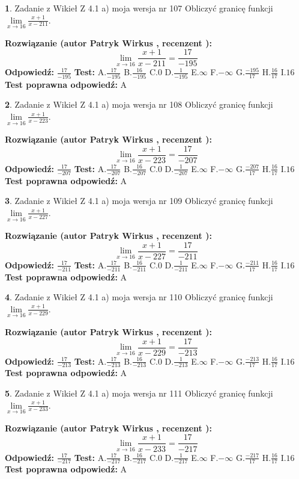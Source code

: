 \documentclass[12pt, a4paper]{article}
\theoremstyle{definition} %
\newtheorem{zad}{}
\newcommand{\zadStart}[1]{\begin{zad}#1\newline}
\newcommand{\zadStop}{\end{zad}}
\newcommand{\rozwStart}[2]{\noindent \textbf{Rozwiązanie (autor #1 , recenzent #2): }\newline}
\newcommand{\rozwStop}{\newline}
\newcommand{\odpStart}{\noindent \textbf{Odpowiedź:}\newline}
\newcommand{\odpStop}{\newline}
\newcommand{\testStart}{\noindent \textbf{Test:}\newline}
\newcommand{\testStop}{\newline}
\newcommand{\kluczStart}{\noindent \textbf{Test poprawna odpowiedź:}\newline}
\newcommand{\kluczStop}{\newline}
\begin{document}
\zadStart{Zadanie z Wikieł Z 4.1 a) moja wersja nr 107}
Obliczyć granicę funkcji $\lim\limits_{x\to16}\frac{x+1}{x-211}$.
\zadStop
\rozwStart{Patryk Wirkus}{}
$$\lim\limits_{x\to16}\frac{x+1}{x-211} = \frac{17}{-195}$$
\rozwStop
\odpStart
$\frac{17}{-195}$
\odpStop
\testStart
A.$\frac{17}{-195}$
B.$\frac{16}{-195}$
C.$0$
D.$\frac{1}{-195}$
E.$\infty$
F.$-\infty$
G.$\frac{-195}{17}$
H.$\frac{16}{17}$
I.$16$
\testStop
\kluczStart
A
\kluczStop



\zadStart{Zadanie z Wikieł Z 4.1 a) moja wersja nr 108}
Obliczyć granicę funkcji $\lim\limits_{x\to16}\frac{x+1}{x-223}$.
\zadStop
\rozwStart{Patryk Wirkus}{}
$$\lim\limits_{x\to16}\frac{x+1}{x-223} = \frac{17}{-207}$$
\rozwStop
\odpStart
$\frac{17}{-207}$
\odpStop
\testStart
A.$\frac{17}{-207}$
B.$\frac{16}{-207}$
C.$0$
D.$\frac{1}{-207}$
E.$\infty$
F.$-\infty$
G.$\frac{-207}{17}$
H.$\frac{16}{17}$
I.$16$
\testStop
\kluczStart
A
\kluczStop



\zadStart{Zadanie z Wikieł Z 4.1 a) moja wersja nr 109}
Obliczyć granicę funkcji $\lim\limits_{x\to16}\frac{x+1}{x-227}$.
\zadStop
\rozwStart{Patryk Wirkus}{}
$$\lim\limits_{x\to16}\frac{x+1}{x-227} = \frac{17}{-211}$$
\rozwStop
\odpStart
$\frac{17}{-211}$
\odpStop
\testStart
A.$\frac{17}{-211}$
B.$\frac{16}{-211}$
C.$0$
D.$\frac{1}{-211}$
E.$\infty$
F.$-\infty$
G.$\frac{-211}{17}$
H.$\frac{16}{17}$
I.$16$
\testStop
\kluczStart
A
\kluczStop



\zadStart{Zadanie z Wikieł Z 4.1 a) moja wersja nr 110}
Obliczyć granicę funkcji $\lim\limits_{x\to16}\frac{x+1}{x-229}$.
\zadStop
\rozwStart{Patryk Wirkus}{}
$$\lim\limits_{x\to16}\frac{x+1}{x-229} = \frac{17}{-213}$$
\rozwStop
\odpStart
$\frac{17}{-213}$
\odpStop
\testStart
A.$\frac{17}{-213}$
B.$\frac{16}{-213}$
C.$0$
D.$\frac{1}{-213}$
E.$\infty$
F.$-\infty$
G.$\frac{-213}{17}$
H.$\frac{16}{17}$
I.$16$
\testStop
\kluczStart
A
\kluczStop



\zadStart{Zadanie z Wikieł Z 4.1 a) moja wersja nr 111}
Obliczyć granicę funkcji $\lim\limits_{x\to16}\frac{x+1}{x-233}$.
\zadStop
\rozwStart{Patryk Wirkus}{}
$$\lim\limits_{x\to16}\frac{x+1}{x-233} = \frac{17}{-217}$$
\rozwStop
\odpStart
$\frac{17}{-217}$
\odpStop
\testStart
A.$\frac{17}{-217}$
B.$\frac{16}{-217}$
C.$0$
D.$\frac{1}{-217}$
E.$\infty$
F.$-\infty$
G.$\frac{-217}{17}$
H.$\frac{16}{17}$
I.$16$
\testStop
\kluczStart
A
\kluczStop
\end{document}

